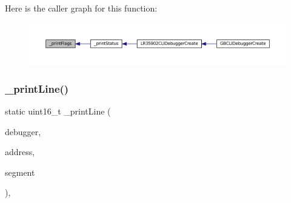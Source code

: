 Here is the caller graph for this function\+:
\nopagebreak
\begin{figure}[H]
\begin{center}
\leavevmode
\includegraphics[width=350pt]{lr35902_2debugger_2cli-debugger_8c_a6f66f89891de505acabfc2381290bd70_icgraph}
\end{center}
\end{figure}
\mbox{\label{lr35902_2debugger_2cli-debugger_8c_a565a93fd2698bb6df9b06c322025a6cc}} 
\subsubsection{\texorpdfstring{\+\_\+print\+Line()}{\_printLine()}}
{\footnotesize\ttfamily static uint16\+\_\+t \+\_\+print\+Line (\begin{DoxyParamCaption}\item[{struct C\+L\+I\+Debugger $\ast$}]{debugger,  }\item[{uint16\+\_\+t}]{address,  }\item[{\mbox{\hyperlink{ioapi_8h_a787fa3cf048117ba7123753c1e74fcd6}{int}}}]{segment }\end{DoxyParamCaption})\hspace{0.3cm}{\ttfamily [inline]}, {\ttfamily [static]}}

